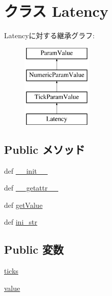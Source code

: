\hypertarget{classm5_1_1params_1_1Latency}{
\section{クラス Latency}
\label{classm5_1_1params_1_1Latency}
}
Latencyに対する継承グラフ:\begin{figure}[H]
\begin{center}
\leavevmode
\includegraphics[height=4cm]{classm5_1_1params_1_1Latency}
\end{center}
\end{figure}
\subsection*{Public メソッド}
\begin{DoxyCompactItemize}
\item 
def \hyperlink{classm5_1_1params_1_1Latency_ac775ee34451fdfa742b318538164070e}{\_\-\_\-init\_\-\_\-}
\item 
def \hyperlink{classm5_1_1params_1_1Latency_a0a990b3ec3889d40889daca9ee5e4695}{\_\-\_\-getattr\_\-\_\-}
\item 
def \hyperlink{classm5_1_1params_1_1Latency_acc340fbd4335fa34f9d57fb454b28ed0}{getValue}
\item 
def \hyperlink{classm5_1_1params_1_1Latency_a33ebe6cd32bcbd15465fc28b9d94bf82}{ini\_\-str}
\end{DoxyCompactItemize}
\subsection*{Public 変数}
\begin{DoxyCompactItemize}
\item 
\hyperlink{classm5_1_1params_1_1Latency_a278a1f181e2be02613530daeaa8afdab}{ticks}
\item 
\hyperlink{classm5_1_1params_1_1Latency_afcc7a4b78ecd8fa7e713f8cfa0f51017}{value}
\end{DoxyCompactItemize}



